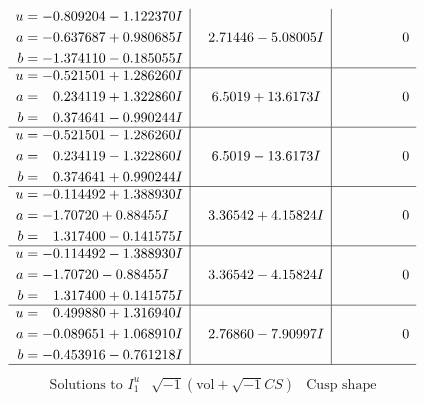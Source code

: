 \documentclass[1p]{elsarticle_modified}
\theoremstyle{definition}
\newcommand{\I}{\sqrt{-1}}
\begin{document}
$$\begin{array}{c|c|c}
\begin{aligned}
u &= -0.809204 - 1.122370 I \\
a &= -0.637687 + 0.980685 I \\
b &= -1.374110 - 0.185055 I\end{aligned}
 & \phantom{-}2.71446 - 5.08005 I & \phantom{-0.000000 } 0 \\ \hline\begin{aligned}
u &= -0.521501 + 1.286260 I \\
a &= \phantom{-}0.234119 + 1.322860 I \\
b &= \phantom{-}0.374641 - 0.990244 I\end{aligned}
 & \phantom{-}6.5019 + 13.6173 I & \phantom{-0.000000 } 0 \\ \hline\begin{aligned}
u &= -0.521501 - 1.286260 I \\
a &= \phantom{-}0.234119 - 1.322860 I \\
b &= \phantom{-}0.374641 + 0.990244 I\end{aligned}
 & \phantom{-}6.5019 - 13.6173 I & \phantom{-0.000000 } 0 \\ \hline\begin{aligned}
u &= -0.114492 + 1.388930 I \\
a &= -1.70720 + 0.88455 I \\
b &= \phantom{-}1.317400 - 0.141575 I\end{aligned}
 & \phantom{-}3.36542 + 4.15824 I & \phantom{-0.000000 } 0 \\ \hline\begin{aligned}
u &= -0.114492 - 1.388930 I \\
a &= -1.70720 - 0.88455 I \\
b &= \phantom{-}1.317400 + 0.141575 I\end{aligned}
 & \phantom{-}3.36542 - 4.15824 I & \phantom{-0.000000 } 0 \\ \hline\begin{aligned}
u &= \phantom{-}0.499880 + 1.316940 I \\
a &= -0.089651 + 1.068910 I \\
b &= -0.453916 - 0.761218 I\end{aligned}
 & \phantom{-}2.76860 - 7.90997 I & \phantom{-0.000000 } 0\\
 \hline 
 \end{array}$$\newpage$$\begin{array}{c|c|c}  
\text{Solutions to }I^u_{1}& \I (\text{vol} + \sqrt{-1}CS) & \text{Cusp shape}\\
 \hline 
\begin{aligned}

\end{aligned}
\end{array}$$
\end{document}
